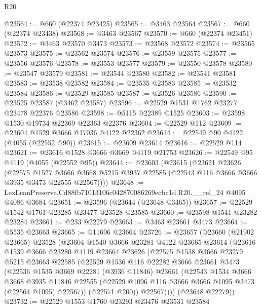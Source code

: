 \begin{lexlean}{R20}
\begin{coremodule}
@23564 := @660 (@22374 @23425)
@23565 := @3463 @23564
@23567 := @660 (@22374 @23438)
@23568 := @3463 @23567
@23570 := @660 (@22374 @23451)
@23572 := @3463 @23570 @3473
@23573 := @23568 @23572
@23574 := @23565 @23573
@23575 := @23562 @23574
@23576 := @23559 @23575
@23577 := @23556 @23576
@23578 := @23553 @23577
@23579 := @23550 @23578
@23580 := @23547 @23579
@23581 := @23544 @23580
@23582 := @23541 @23581
@23583 := @23538 @23582
@23584 := @23535 @23583
@23585 := @23532 @23584
@23586 := @23529 @23585
@23587 := @23526 @23586
@23590 := @23525 @23587 (@3462 @23587)
@23596 := @22529 @1531 @1762 @23277 @23478 @22376 @23586
@23598 := @5115 @22389 @1525
@23603 := @23598 @1530 @19734 @22369 @22363 @22376
@23604 := @22529 @112
@23609 := @23604 @1529 @3666 @17036 @4122 @22362
@23614 := @22549 @90 @4122 (@4055 (@22552 @90))
@23615 := @23609 @23614
@23616 := @22529 @114
@23621 := @23616 @1528 @3666 @3669 @4119 @21753
@23626 := @22549 @95 @4119 (@4055 (@22552 @95))
@23644 := @23603
    (@23615
      (@23621
        @23626
        (@22575
          @1527
          @3666
          @3668
          @5215
          @3937
          @22585
          (@22543 @116 @3666 @3666 @3935 @3473 @22555 @22567))))
@23648 := LexLeanPreserve.Cd88fb71013106c042870086269ecbc1d.R20.__rel_24 @4095 @4086 @3684
@23651 := @23596 (@23644 (@23648 @3465))
@23657 := @22529 @1542 @1761 @23285 @23477 @23528 @23585
@23660 := @23598 @1541 @23282 @23284
@23661 := @233 @22279
@23663 := @3463 @23661 @3473
@23664 := @5535 @23663
@23665 := @11696 @23664
@23726 := @23657
    (@23660
      (@21902 @23665)
      @23528
      (@23604
        @1540
        @3666
        @23281
        @4122
        @23665
        @23614
        (@23616
          @1539
          @3666
          @23280
          @4119
          @23664
          @23626
          (@22575
            @1538
            @3666
            @23279
            @5215
            @23663
            @22585
            (@22529
              @1536
              @116
              @22282
              @3666
              @23661
              @3473
              (@22536
                @1535
                @3669
                @22281
                (@3936 @11846)
                @23661
                (@22543
                  @1534
                  @3666
                  @3668
                  @3935
                  @11846
                  @22555
                  (@22529 @1096 @116 @3666 @3666 @1095 @3473 (@22564 @1095) @22567))
                (@22571 @200))
              @22567))))
      (@23648 @22279))
@23732 := @22529 @1553 @1760 @23293 @23476 @23531 @23584

\end{coremodule}
\end{lexlean}
